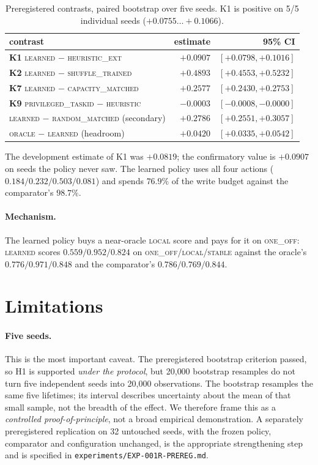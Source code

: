 \documentclass[11pt]{article}
\begin{document}
\begin{table}[t]
\centering
\begin{tabular}{lrr}
\toprule
contrast & estimate & 95\% CI \\
\midrule
\textbf{K1} \textsc{learned} $-$ \textsc{heuristic\_ext} & $+0.0907$ & $[+0.0798, +0.1016]$ \\
\textbf{K2} \textsc{learned} $-$ \textsc{shuffle\_trained} & $+0.4893$ & $[+0.4553, +0.5232]$ \\
\textbf{K7} \textsc{learned} $-$ \textsc{capacity\_matched} & $+0.2577$ & $[+0.2430, +0.2753]$ \\
\textbf{K9} \textsc{privileged\_taskid} $-$ \textsc{heuristic} & $-0.0003$ & $[-0.0008, -0.0000]$ \\
\textsc{learned} $-$ \textsc{random\_matched} (secondary) & $+0.2786$ & $[+0.2551, +0.3057]$ \\
\textsc{oracle} $-$ \textsc{learned} (headroom) & $+0.0420$ & $[+0.0335, +0.0542]$ \\
\bottomrule
\end{tabular}
\caption{Preregistered contrasts, paired bootstrap over five seeds.
K1 is positive on 5/5 individual seeds ($+0.0755 \ldots +0.1066$).}
\label{tab:contrasts}
\end{table}

The development estimate of K1 was $+0.0819$; the confirmatory value is
$+0.0907$ on seeds the policy never saw. The learned policy uses all four
actions ($0.184 / 0.232 / 0.503 / 0.081$) and spends $76.9\%$ of the write
budget against the comparator's $98.7\%$.

\paragraph{Mechanism.} The learned policy buys a near-oracle \textsc{local}
score and pays for it on \textsc{one\_off}: \textsc{learned} scores
$0.559 / 0.952 / 0.824$ on \textsc{one\_off}/\textsc{local}/\textsc{stable}
against the oracle's $0.776 / 0.971 / 0.848$ and the comparator's
$0.786 / 0.769 / 0.844$.

\section{Limitations}

\paragraph{Five seeds.} This is the most important caveat. The preregistered
bootstrap criterion passed, so H1 is supported \emph{under the protocol}, but
20{,}000 bootstrap resamples do not turn five independent seeds into 20{,}000
observations. The bootstrap resamples the same five lifetimes; its interval
describes uncertainty about the mean of that small sample, not the breadth of
the effect. We therefore frame this as a \emph{controlled proof-of-principle},
not a broad empirical demonstration. A separately preregistered replication on
32 untouched seeds, with the frozen policy, comparator and configuration
unchanged, is the appropriate strengthening step and is specified in
\texttt{experiments/EXP-001R-PREREG.md}.
\end{document}
